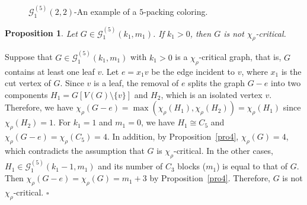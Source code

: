 \documentclass[12pt]{article}
\newtheorem{proposition}[theorem]{Proposition}
\newcommand{\proof}{\noindent{\bf Proof.\ }}
\newcommand{\qed}{\hfill $\square$ \bigskip}
\newcommand{\ie}{that is}
\begin{document}
\begin{figure}[H]
\centering		
{}
\caption{$\mathcal{G}_{1}^{(5)}(2,2)$-An example of a $5$-packing coloring.}
\label{fig6}
\end{figure}

\begin{proposition}\label{pro5} 
Let $G \in \mathcal{G}_{1}^{(5)}(k_1,m_1)$. If $k_1 > 0$, then $G$ is not $\chi_{\rho}$-critical. 
\end{proposition}

\proof Suppose that $G \in \mathcal{G}_{1}^{(5)}(k_1,m_1)$  with $k_1 > 0$ is a \( \chi_\rho \)-critical graph, \ie, $G$ contains at least one leaf \( v \). Let \( e = x_1v \) be the edge incident to \( v \), where \( x_1 \) is the cut vertex of $G$.  Since \( v \) is a leaf, the removal of \( e \) splits the graph $G-e$ into two components \( H_1=G[V(G) \setminus \{v\}] \) and $H_2$, which is an isolated vertex $v$. Therefore, we have $\chi_\rho(G-e)=\max \left(\chi_\rho\left(H_1\right), \chi_\rho\left(H_2\right)\right)=\chi_\rho(H_1)$ since $\chi_\rho(H_2)=1$. For $k_1 = 1$ and $m_1=0$, we have $H_1 \cong C_5$ and $\chi_\rho(G-e)=\chi_\rho(C_5)=4$. In addition, by Proposition~\ref{pro4}, $\chi_\rho(G)=4$, which contradicts the assumption that \( G \) is \( \chi_\rho \)-critical. In the other cases, $H_1 \in \mathcal{G}_{1}^{(5)}(k_1-1,m_1)$ and its number of $C_3$ blocks ($m_1$) is equal to that of $G$. Then $\chi_\rho(G - e) = \chi_\rho(G) =m_1+3$ by Proposition~\ref{pro4}. Therefore, $G$ is not $\chi_{\rho}$-critical.
\qed
\end{document}
